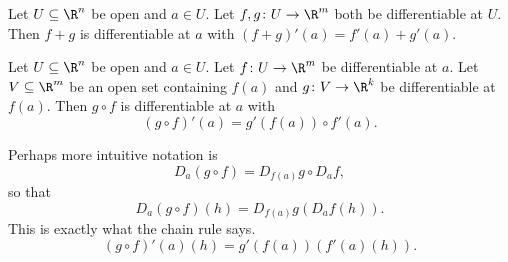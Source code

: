 \begin{exercise}[sum]
    Let $U \subseteq \R^n$ be open and $a \in U$.
    Let $f, g\colon U \to \R^m$ both be differentiable at $U$.
    Then $f+g$ is differentiable at $a$ with
    $(f+g)'(a) = f'(a) + g'(a)$.
\end{exercise}

\begin{proposition*} \label{thm:chain}
    Let $U \subseteq \R^n$ be open and $a \in U$.
    Let $f\colon U \to \R^m$ be differentiable at $a$.
    Let $V \subseteq \R^m$ be an open set containing $f(a)$
    and $g\colon V \to \R^k$ be differentiable at $f(a)$.
    Then $g \circ f$ is differentiable at $a$ with \[
        (g \circ f)'(a) = g'(f(a)) \circ f'(a).
    \]
\end{proposition*}
Perhaps more intuitive notation is \[
    D_a(g \circ f) = D_{f(a)} g \circ D_a f,
\] so that \[
    D_a(g \circ f)(h) = D_{f(a)} g(D_a f(h)).
\] This is exactly what the chain rule says.
\[
    (g \circ f)'(a)(h) = g'(f(a))(f'(a)(h)).
\]
